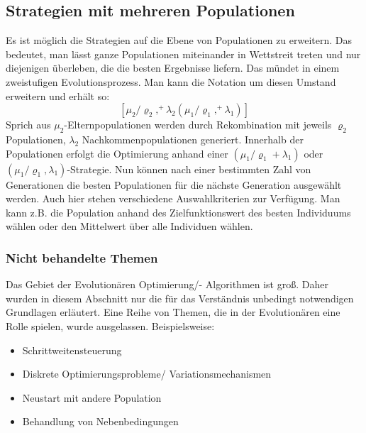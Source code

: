 \subsection{Strategien mit mehreren Populationen}
Es ist möglich die Strategien auf die Ebene von Populationen zu erweitern. Das bedeutet, man lässt ganze Populationen miteinander in Wettstreit treten und nur diejenigen überleben, die die besten Ergebnisse liefern. Das mündet in einem zweistufigen Evolutionsprozess. Man kann die Notation um diesen Umstand erweitern und erhält so:
%
$$
[\mu_2/\varrho_2,^{+}\lambda_2(\mu_1/\varrho_1,^{+}\lambda_1)]
$$
Sprich aus $\mu_2$-Elternpopulationen werden durch Rekombination mit jeweils $\varrho_2$ Populationen, $\lambda_2$ Nachkommenpopulationen generiert. Innerhalb der Populationen erfolgt die Optimierung anhand einer $({\mu_1}/{\varrho_1}+\lambda_1)$ oder $({\mu_1}/{\varrho_1},\lambda_1)$-Strategie. Nun können nach einer bestimmten Zahl von Generationen die besten Populationen für die nächste Generation ausgewählt werden. Auch hier stehen verschiedene Auswahlkriterien zur Verfügung. Man kann z.B. die Population anhand des Zielfunktionswert des besten Individuums wählen oder den Mittelwert über alle Individuen wählen.
%
\subsubsection{Nicht behandelte Themen}
%
Das Gebiet der Evolutionären Optimierung/- Algorithmen ist groß. Daher wurden in diesem Abschnitt nur die für das Verständnis unbedingt notwendigen Grundlagen erläutert. Eine Reihe von Themen, die in der Evolutionären eine Rolle spielen, wurde ausgelassen. Beispielsweise:
%
\begin{itemize}[itemsep=0mm]
\item Schrittweitensteuerung
\item Diskrete Optimierungsprobleme/ Variationsmechanismen
\item Neustart mit andere Population
\item Behandlung von Nebenbedingungen
\end{itemize}
%
